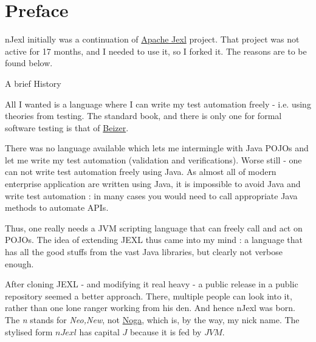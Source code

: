 \chapter{Preface}
 
{\LARGE n}Jexl initially was a continuation of \href{http://commons.apache.org/proper/commons-jexl}{Apache Jexl} project.
That project was not active for 17 months, and I needed to use it, so I forked it. The reasons are to be found below.

\begin{subsection}{A brief History}

All I wanted is a language where I can write my test automation freely - i.e. using theories from testing.
The standard book, and there is only one for formal software testing is 
that of \href{http://www.amazon.com/Software-Testing-Techniques-2nd-Edition/dp/1850328803}{Beizer}.

There was no language available which lets me intermingle with Java POJOs and let me write my test automation (validation and verifications). 
Worse still - one can not write test automation freely using Java. 
As almost all of modern enterprise application are written using Java, it is impossible to avoid Java 
and write test automation : in many cases you would need to call appropriate Java methods to automate APIs.

Thus, one really needs a JVM scripting language that can freely call and act on POJOs.
The idea of extending JEXL thus came into my mind : a language that has all the good stuffs from
the vast Java libraries, but clearly not verbose enough.

After cloning JEXL - and modifying it real heavy - a public release in a public repository
seemed a better approach. There, multiple people can look into it, rather than one lone ranger working from his den.
And hence nJexl was born. The \emph{n} stands for \emph{Neo,New}, 
not \href{https://nmandalh.wordpress.com}{Noga}, which is, by the way, my nick name.
The stylised form $nJexl$ has capital $J$ because it is fed by $JVM$.

\end{subsection}

